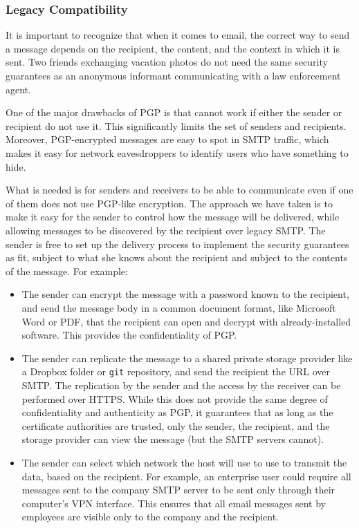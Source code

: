\subsubsection{Legacy Compatibility}

It is important to recognize that when it comes to email, the correct way to
send a message depends on the recipient, the content, and the context in which
it is sent.  Two friends exchanging vacation photos do not need the same
security guarantees as an anonymous informant communicating with a law
enforcement agent.

One of the major drawbacks of PGP is that cannot work if either the
sender or recipient do not use it.  This significantly limits the set of senders
and recipients.  Moreover, PGP-encrypted messages are easy to spot in SMTP
traffic, which makes it easy for network eavesdroppers to identify users who
have something to hide.

What is needed is for senders and receivers to be able to communicate even if
one of them does not use PGP-like encryption.  The approach we have taken is to
make it easy for the sender to control how the message will be delivered, while
allowing messages to be discovered by the recipient over legacy SMTP.  The
sender is free to set up the delivery process to implement the security
guarantees as fit, subject to what she knows about the recipient and subject to
the contents of the message.  For example:

\begin{itemize}
\item The sender can encrypt the message with a password known to the recipient,
and send the message body in a common document format, like Microsoft Word or
PDF, that the recipient can open and decrypt with already-installed software.
This provides the confidentiality of PGP.
\item The sender can replicate the message to a shared private storage provider
like a Dropbox folder or \texttt{git} repository, and send the
recipient the URL over SMTP.  The replication by the sender and the access by
the receiver can be performed over HTTPS.  While this does not provide the same
degree of confidentiality and authenticity as PGP, it guarantees that as long as
the certificate authorities are trusted, only the sender, the recipient, and the
storage provider can view the message (but the SMTP servers cannot).
\item The sender can select which network the host will use to use to transmit the data, based on
the recipient.  For example, an enterprise user could require all messages sent
to the company SMTP server to be sent only through their computer's
VPN interface.  This ensures that all email messages sent by employees are
visible only to the company and the recipient.
\end{itemize}

